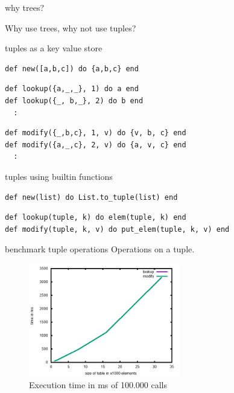 \begin{frame}{why trees?}

\pause \vspace{40pt}
Why use trees, why not use tuples?

\end{frame}

\begin{frame}[fragile]{tuples as a key value store}

\begin{verbatim}
def new([a,b,c]) do {a,b,c} end
\end{verbatim}
\pause
\begin{verbatim}
def lookup({a,_,_}, 1) do a end
def lookup({_, b,_}, 2) do b end
  :
\end{verbatim}
\pause
\begin{verbatim}
def modify({_,b,c}, 1, v) do {v, b, c} end
def modify({a,_,c}, 2, v) do {a, v, c} end
  :

\end{verbatim}

\end{frame}

\begin{frame}[fragile]{tuples using builtin functions}

  
\begin{verbatim}
def new(list) do List.to_tuple(list) end
\end{verbatim}
\pause
\begin{verbatim}
def lookup(tuple, k) do elem(tuple, k) end  
def modify(tuple, k, v) do put_elem(tuple, k, v) end
\end{verbatim}
\pause


\end{frame}


\begin{frame}{benchmark tuple operations}
 Operations on a tuple.
 \begin{figure}
  \centering
  \includegraphics[height=140pt]{table.png}
  \caption{Execution time in ms of 100.000 calls}
 \end{figure}

\end{frame}



